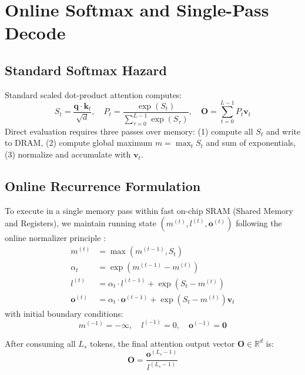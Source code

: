\documentclass[11pt,a4paper]{article}
\begin{document}
\section{Online Softmax and Single-Pass Decode}

\subsection{Standard Softmax Hazard}
Standard scaled dot-product attention computes:
\begin{equation}
S_t = \frac{\mathbf{q} \cdot \mathbf{k}_t}{\sqrt{d}}, \quad P_t = \frac{\exp(S_t)}{\sum_{\tau=0}^{L-1} \exp(S_\tau)}, \quad \mathbf{O} = \sum_{t=0}^{L-1} P_t \mathbf{v}_t
\end{equation}
Direct evaluation requires three passes over memory: (1) compute all $S_t$ and write to DRAM, (2) compute global maximum $m = \max_t S_t$ and sum of exponentials, (3) normalize and accumulate with $\mathbf{v}_t$.

\subsection{Online Recurrence Formulation}

To execute in a single memory pass within fast on-chip SRAM (Shared Memory and Registers), we maintain running state $(m^{(t)}, l^{(t)}, \mathbf{o}^{(t)})$ following the online normalizer principle \cite{milakov2018online, dao2022flashattention, dao2023flashattention2}:
\begin{align}
m^{(t)} &= \max\left( m^{(t-1)}, S_t \right) \\
\alpha_t &= \exp\left( m^{(t-1)} - m^{(t)} \right) \\
l^{(t)} &= \alpha_t \cdot l^{(t-1)} + \exp\left( S_t - m^{(t)} \right) \\
\mathbf{o}^{(t)} &= \alpha_t \cdot \mathbf{o}^{(t-1)} + \exp\left( S_t - m^{(t)} \right) \mathbf{v}_t
\end{align}
with initial boundary conditions:
\begin{equation}
m^{(-1)} = -\infty, \quad l^{(-1)} = 0, \quad \mathbf{o}^{(-1)} = \mathbf{0}
\end{equation}

After consuming all $L_s$ tokens, the final attention output vector $\mathbf{O} \in \mathbb{R}^d$ is:
\begin{equation}
\mathbf{O} = \frac{\mathbf{o}^{(L_s - 1)}}{l^{(L_s - 1)}}
\end{equation}
\end{document}
